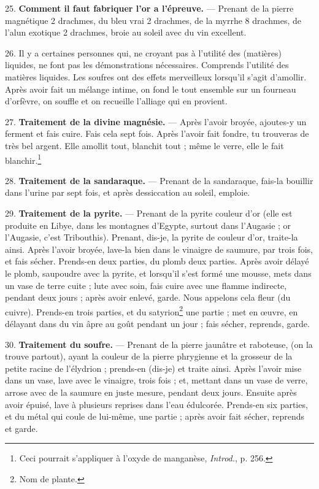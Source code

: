 \documentclass[a4paper, 11pt, oneside, polutonikogreek, french]{article}
\begin{document}
25. \textbf{Comment il faut fabriquer l'or a l'épreuve.} --- Prenant de la pierre magnétique 2 drachmes, du bleu vrai 2 drachmes, de la myrrhe 8 drachmes, de l'alun exotique 2 drachmes, broie au soleil avec du vin excellent.

26. Il y a certaines personnes qui, ne croyant pas à l'utilité des (matières) liquides, ne font pas les démonstrations nécessaires. Comprends l'utilité des matières liquides. Les soufres ont des effets merveilleux lorsqu'il s'agit d'amollir. Après avoir fait un mélange intime, on fond le tout ensemble sur un fourneau d'orfèvre, on souffle et on recueille l'alliage qui en provient.

27. \textbf{Traitement de la divine magnésie.} --- Après l'avoir broyée, ajoutes-y un ferment et fais cuire. Fais cela sept fois. Après l'avoir fait fondre, tu trouveras de très bel argent. Elle amollit tout, blanchit tout ; même le verre, elle le fait blanchir.\footnote{Ceci pourrait s'appliquer à l'oxyde de manganèse, \emph{Introd.}, p. 256.}

28. \textbf{Traitement de la sandaraque.} --- Prenant de la sandaraque, fais-la bouillir dans l'urine par sept fois, et après dessiccation au soleil, emploie.

29. \textbf{Traitement de la pyrite.} --- Prenant de la pyrite couleur d'or (elle est produite en Libye, dans les montagnes d'Egypte, surtout dans l'Augasie ; or l'Augasie, c'est Tribouthis). Prenant, dis-je, la pyrite de couleur d'or, traite-la ainsi. Après l'avoir broyée, lave-la bien dans le vinaigre de saumure, par trois fois, et fais sécher. Prends-en deux parties, du plomb deux parties. Après avoir délayé le plomb, saupoudre avec la pyrite, et lorsqu'il s'est formé une mousse, mets dans un vase de terre cuite ; lute avec soin, fais cuire avec une flamme indirecte, pendant deux jours ; après avoir enlevé, garde. Nous appelons cela fleur (du cuivre). Prends-en trois parties, et du satyrion\footnote{Nom de plante.} une partie ; met en œuvre, en délayant dans du vin âpre au goût pendant un jour ; fais sécher, reprends, garde.

30. \textbf{Traitement du soufre.} --- Prenant de la pierre jaunâtre et raboteuse, (on la trouve partout), ayant la couleur de la pierre phrygienne et la grosseur de la petite racine de l'élydrion ; prends-en (dis-je) et traite ainsi. Après l'avoir mise dans un vase, lave avec le vinaigre, trois fois ; et, mettant dans un vase de verre, arrose avec de la saumure en juste mesure, pendant deux jours. Ensuite après avoir épuisé, lave à plusieurs reprises dans l'eau édulcorée. Prends-en six parties, et du métal qui coule de lui-même, une partie ; après avoir fait sécher, reprends et garde.
\end{document}
